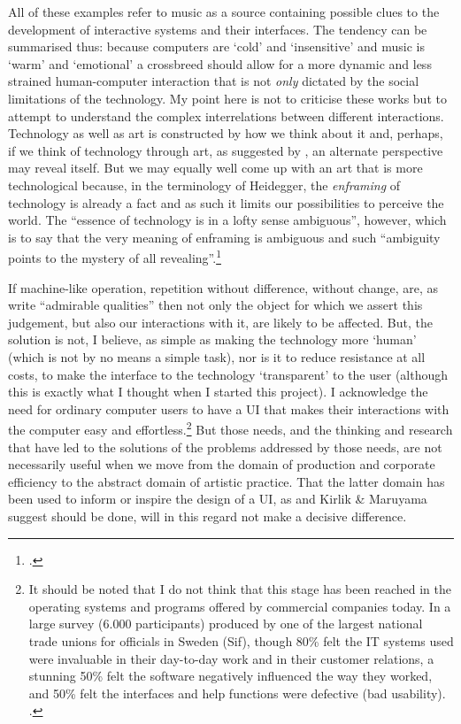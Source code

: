All of these examples refer to music as a source containing possible clues to the development of interactive systems and their interfaces. The tendency can be summarised thus: because computers are `cold' and `insensitive' and music is `warm' and `emotional' a crossbreed should allow for a more dynamic and less strained human-computer interaction that is not \emph{only} dictated by the social limitations of the technology. My point here is not to criticise these works but to attempt to understand the complex interrelations between different interactions. Technology as well as art is constructed by how we think about it and, perhaps, if we think of technology through art, as suggested by \citeauthor{heidegger93}, an alternate perspective may reveal itself. But we may equally well come up with an art that is more technological because, in the terminology of Heidegger, the \emph{enframing} of technology is already a fact and as such it limits our possibilities to perceive the world. The ``essence of technology is in a lofty sense ambiguous'', however, which is to say that the very meaning of enframing is ambiguous and such ``ambiguity points to the mystery of all revealing''.\footcite[338]{heidegger93} 


If machine-like operation, repetition without difference, without change, are, as \citeauthor{kirlik04} write ``admirable qualities'' then not only the object for which we assert this judgement, but also our interactions with it, are likely to be affected. But, the solution is not, I believe, as simple as making the technology more `human' (which is not by no means a simple task), nor is it to reduce resistance at all costs, to make the interface to the technology `transparent' to the user (although this is exactly what I thought when I started this project). I acknowledge the need for ordinary computer users to have a UI that makes their interactions with the computer easy and effortless.\footnote{It should be noted that I do not think that this stage has been reached in the operating systems and programs offered by commercial companies today. In a large survey (6.000 participants) produced by one of the largest national trade unions for officials in Sweden (Sif), though 80\% felt the IT systems used were invaluable in their day-to-day work and in their customer relations, a stunning 50\% felt the software negatively influenced the way they worked, and 50\% felt the interfaces and help functions were defective (bad usability). \cite[See the (Swedish) report][]{sif07}.}  But those needs, and the thinking and research that have led to the solutions of the problems addressed by those needs, are not necessarily useful when we move from the domain of production and corporate efficiency to the abstract domain of artistic practice. That the latter domain has been used to inform or inspire the design of a UI, as \citeauthor{thomassen03} and Kirlik \& Maruyama suggest should be done, will in this regard not make a decisive difference. 

